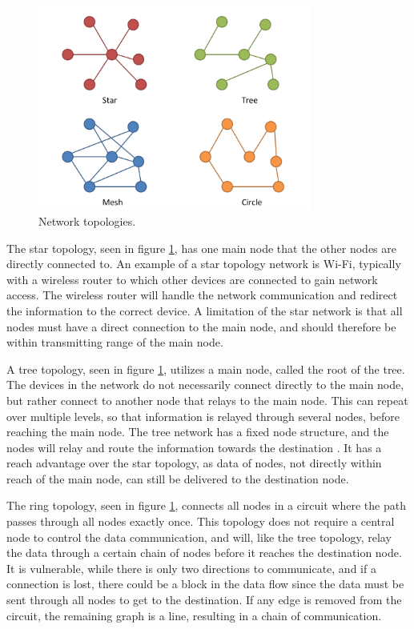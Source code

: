 \begin{figure}[h!]
	\centering
	\includegraphics[width=0.8\textwidth]{figures/topologies.png}
	\caption{Network topologies.}
	\label{fig:topologies}
\end{figure}

The star topology, seen in figure \ref{fig:topologies}, has one main node that the other nodes are directly connected to. An example of a star topology network is Wi-Fi, typically with a wireless router to which other devices are connected to gain network access. The wireless router will handle the network communication and redirect the information to the correct device. A limitation of the star network is that all nodes must have a direct connection to the main node, and should therefore be within transmitting range of the main node.

A tree topology, seen in figure \ref{fig:topologies}, utilizes a main node, called the root of the tree. The devices in the network do not necessarily connect directly to the main node, but rather connect to another node that relays to the main node. This can repeat over multiple levels, so that information is relayed through several nodes, before reaching the main node. The tree network has a fixed node structure, and the nodes will relay and route the information towards the destination \cite{kizza2015guide}. It has a reach advantage over the star topology, as data of nodes, not directly within reach of the main node, can still be delivered to the destination node.

The ring topology, seen in figure \ref{fig:topologies}, connects all nodes in a circuit where the path passes through all nodes exactly once. This topology does not require a central node to control the data communication, and will, like the tree topology, relay the data through a certain chain of nodes before it reaches the destination node. It is vulnerable, while there is only two directions to communicate, and if a connection is lost, there could be a block in the data flow since the data must be sent through all nodes to get to the destination. If any edge is removed from the circuit, the remaining graph is a line, resulting in a chain of communication.


